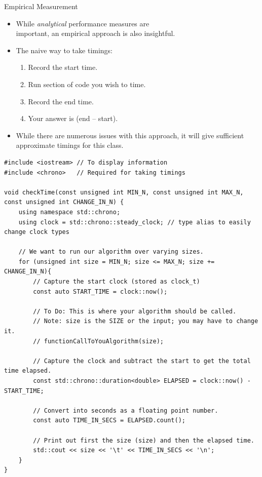 \documentclass[14pt,aspectratio=1610, hyperref={pdfpagelayout=SinglePage}]{beamer}
\begin{document}
\begin{frame}{Empirical Measurement}
\begin{itemize}
\item While \emph{analytical} performance measures are\\ important, an empirical approach is also insightful.
\item The naive way to take timings:
\begin{enumerate}
\item Record the start time.
\item Run section of code you wish to time.
\item Record the end time.
\item Your answer is (end -- start).
\end{enumerate}
\item While there are numerous issues with this approach, it will give sufficient approximate timings for this class.
\end{itemize}
\end{frame}


\begin{frame}[fragile]{}
\begin{lstlisting}[basicstyle=\scriptsize\ttfamily]
#include <iostream> // To display information
#include <chrono>   // Required for taking timings

void checkTime(const unsigned int MIN_N, const unsigned int MAX_N, const unsigned int CHANGE_IN_N) {
	using namespace std::chrono;
	using clock = std::chrono::steady_clock; // type alias to easily change clock types

	// We want to run our algorithm over varying sizes.
	for (unsigned int size = MIN_N; size <= MAX_N; size += CHANGE_IN_N){
		// Capture the start clock (stored as clock_t)
		const auto START_TIME = clock::now();

		// To Do: This is where your algorithm should be called.
		// Note: size is the SIZE or the input; you may have to change it.
		// functionCallToYouAlgorithm(size);

		// Capture the clock and subtract the start to get the total time elapsed.
		const std::chrono::duration<double> ELAPSED = clock::now() - START_TIME;

		// Convert into seconds as a floating point number.
		const auto TIME_IN_SECS = ELAPSED.count();

		// Print out first the size (size) and then the elapsed time.
		std::cout << size << '\t' << TIME_IN_SECS << '\n';
	}
}
\end{lstlisting}
\end{frame}
\end{document}
